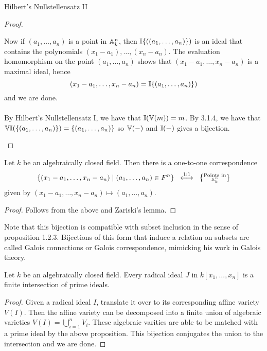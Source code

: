 \documentclass[a4paper]{article}
\begin{document}
\begin{thm}{Hilbert's Nullstellensatz II}{}
\begin{proof}
\begin{itemize}
Now if $(a_1,\dots,a_n)$ is a point in $\mathbb{A}_k^n$, then $\mathbb{I}\{((a_1,\dots,a_n)\})$ is an ideal that contains the polynomials $(x_1-a_1),\dots,(x_n-a_n)$. The evaluation homomorphism on the point $(a_1,\dots,a_n)$ shows that $(x_1-a_1,\dots,x_n-a_n)$ is a maximal ideal, hence $$(x_1-a_1,\dots,x_n-a_n)=\mathbb{I}\{(a_1,\dots,a_n)\})$$ and we are done. \\~\\

By Hilbert's Nullstellensatz I, we have that $\mathbb{I}(\mathbb{V}(m))=m$. By 3.1.4, we have that $\mathbb{V}\mathbb{I}(\{(a_1,\dots,a_n)\})=\{(a_1,\dots,a_n)\}$ so $\mathbb{V}(-)$ and $\mathbb{I}(-)$ gives a bijection. 
\end{itemize}
\end{proof}
\end{thm}

\begin{lmm}{}{} Let $k$ be an algebraically closed field. Then there is a one-to-one correspondence $$\{(x_1-a_1,\dots,x_n-a_n)\;|\;(a_1,\dots,a_n)\in F^n\}\;\;\overset{\text{1:1}}{\longleftrightarrow}\;\;\left\{\substack{\text{Points in}\\\mathbb{A}_k^n}\right\}$$ given by $(x_1-a_1,\dots,x_n-a_n)\mapsto(a_1,\dots,a_n)$. \tcbline
\begin{proof}
Follows from the above and Zariski's lemma. 
\end{proof}
\end{lmm}

Note that this bijection is compatible with subset inclusion in the sense of proposition 1.2.3. Bijections of this form that induce a relation on subsets are called Galois connections or Galois correspondence, mimicking his work in Galois theory. 

\begin{prp}{}{} Let $k$ be an algebraically closed field. Every radical ideal $J$ in $k[x_1,\dots,x_n]$ is a finite intersection of prime ideals. \tcbline
\begin{proof}
Given a radical ideal $I$, translate it over to its corresponding affine variety $V(I)$. Then the affine variety can be decomposed into a finite union of algebraic varieties $V(I)=\bigcup_{i=1}^nV_i$. These algebraic varities are able to be matched with a prime ideal by the above proposition. This bijection conjugates the union to the intersection and we are done. 
\end{proof}
\end{prp}
\end{document}
